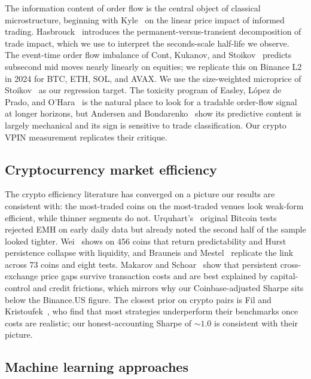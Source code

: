\documentclass[11pt]{article}
\begin{document}
The information content of order flow is the central object of classical microstructure,
beginning with Kyle~\cite{kyle1985continuous} on the linear price impact of informed
trading. Hasbrouck~\cite{hasbrouck1991measuring} introduces the permanent-versus-transient
decomposition of trade impact, which we use to interpret the seconds-scale half-life we
observe. The event-time order flow imbalance of Cont, Kukanov, and
Stoikov~\cite{contkukanovstoikov2014} predicts subsecond mid moves nearly linearly on
equities; we replicate this on Binance L2 in 2024 for BTC, ETH, SOL, and AVAX. We use the
size-weighted microprice of Stoikov~\cite{stoikov2018microprice} as our regression target.
The toxicity program of Easley, L\'opez de Prado, and O'Hara~\cite{easley2012vpin} is the
natural place to look for a tradable order-flow signal at longer horizons, but Andersen and
Bondarenko~\cite{andersen2014vpin} show its predictive content is largely mechanical and
its sign is sensitive to trade classification. Our crypto VPIN measurement replicates their
critique.

\subsection{Cryptocurrency market efficiency}
\label{sec:related-crypto}

The crypto efficiency literature has converged on a picture our results are consistent
with: the most-traded coins on the most-traded venues look weak-form efficient, while
thinner segments do not. Urquhart's~\cite{urquhart2016inefficiency} original Bitcoin tests
rejected EMH on early daily data but already noted the second half of the sample looked
tighter. Wei~\cite{wei2018liquidity} shows on 456 coins that return predictability and
Hurst persistence collapse with liquidity, and Brauneis and Mestel~\cite{brauneis2018price}
replicate the link across 73 coins and eight tests. Makarov and
Schoar~\cite{makarov2020trading} show that persistent cross-exchange price gaps survive
transaction costs and are best explained by capital-control and credit frictions, which
mirrors why our Coinbase-adjusted Sharpe sits below the Binance.US figure. The closest
prior on crypto pairs is Fil and Kristoufek~\cite{fil2020pairs}, who find that most
strategies underperform their benchmarks once costs are realistic; our honest-accounting
Sharpe of $\sim$$1.0$ is consistent with their picture.

\subsection{Machine learning approaches}
\label{sec:related-ml}
\end{document}
